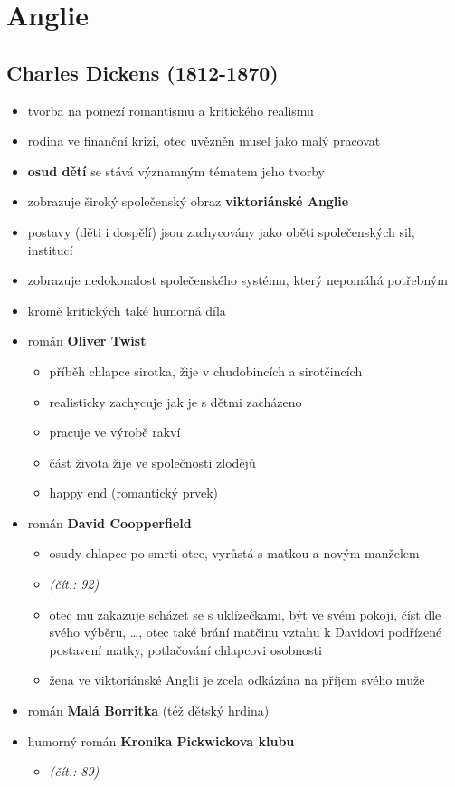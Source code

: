 \section{Anglie}
\subsection{Charles Dickens (1812-1870)}
\begin{itemize}
\item tvorba na pomezí romantismu a kritického realismu
\item rodina ve finanční krizi, otec uvězněn \ra musel jako malý pracovat
\item \textbf{osud dětí} se stává významným tématem jeho tvorby
\item zobrazuje široký společenský obraz \textbf{viktoriánské Anglie}
\item postavy (děti i dospělí) jsou zachycovány jako oběti společenských sil, institucí
\item zobrazuje nedokonalost společenského systému, který nepomáhá potřebným
\item kromě kritických také humorná díla
\item román \textbf{Oliver Twist}
	\begin{itemize}
	\item příběh chlapce sirotka, žije v chudobincích a sirotčincích
	\item realisticky zachycuje jak je s dětmi zacházeno
	\item pracuje ve výrobě rakví
	\item část života žije ve společnosti zlodějů
	\item happy end (romantický prvek)
	\end{itemize}
\item román \textbf{David Coopperfield}
	\begin{itemize}
	\item osudy chlapce po smrti otce, vyrůstá s matkou a novým manželem
	\item \textit{(čít.: 92)}
	\item otec mu zakazuje scházet se s uklízečkami, být ve svém pokoji, číst dle svého výběru, \ldots, otec také brání matčinu vztahu k Davidovi \ra podřízené postavení matky, potlačování chlapcovi osobnosti
	\item žena ve viktoriánské Anglii je zcela odkázána na příjem svého muže
	\end{itemize}
\item román \textbf{Malá Borritka} (též dětský hrdina)
\item humorný román \textbf{Kronika Pickwickova klubu}
	\begin{itemize}
	\item \textit{(čít.: 89)}
	\end{itemize}
\end{itemize}


